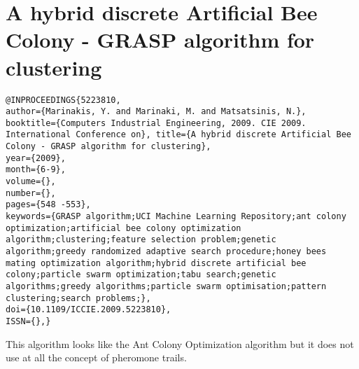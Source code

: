 \documentclass[pdftex,11pt]{article}
\begin{document}
\section{A hybrid discrete Artificial Bee Colony - GRASP algorithm for clustering}
\begin{verbatim}
@INPROCEEDINGS{5223810, 
author={Marinakis, Y. and Marinaki, M. and Matsatsinis, N.}, 
booktitle={Computers Industrial Engineering, 2009. CIE 2009. International Conference on}, title={A hybrid discrete Artificial Bee Colony - GRASP algorithm for clustering}, 
year={2009}, 
month={6-9}, 
volume={}, 
number={}, 
pages={548 -553}, 
keywords={GRASP algorithm;UCI Machine Learning Repository;ant colony optimization;artificial bee colony optimization algorithm;clustering;feature selection problem;genetic algorithm;greedy randomized adaptive search procedure;honey bees mating optimization algorithm;hybrid discrete artificial bee colony;particle swarm optimization;tabu search;genetic algorithms;greedy algorithms;particle swarm optimisation;pattern clustering;search problems;}, 
doi={10.1109/ICCIE.2009.5223810}, 
ISSN={},}
\end{verbatim}
This algorithm looks like the Ant Colony Optimization algorithm but it does not use at all the concept of pheromone trails.
\end{document}
